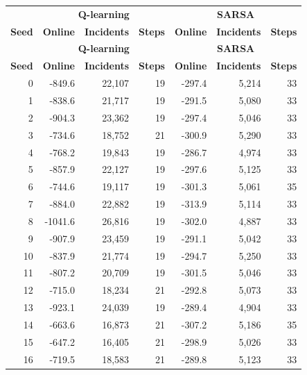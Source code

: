 \begin{longtable}{rrrrrrr}
\toprule
 & \multicolumn{3}{c}{\textbf{Q-learning}} & \multicolumn{3}{c}{\textbf{SARSA}} \\
\textbf{Seed} & \textbf{Online} & \textbf{Incidents} & \textbf{Steps}
              & \textbf{Online} & \textbf{Incidents} & \textbf{Steps} \\
\midrule
\endfirsthead
\toprule
 & \multicolumn{3}{c}{\textbf{Q-learning}} & \multicolumn{3}{c}{\textbf{SARSA}} \\
\textbf{Seed} & \textbf{Online} & \textbf{Incidents} & \textbf{Steps}
              & \textbf{Online} & \textbf{Incidents} & \textbf{Steps} \\
\midrule
\endhead
 0 &    -849.6 &  22{,}107 &    19 &    -297.4 &   5{,}214 &    33 \\
 1 &    -838.6 &  21{,}717 &    19 &    -291.5 &   5{,}080 &    33 \\
 2 &    -904.3 &  23{,}362 &    19 &    -297.4 &   5{,}046 &    33 \\
 3 &    -734.6 &  18{,}752 &    21 &    -300.9 &   5{,}290 &    33 \\
 4 &    -768.2 &  19{,}843 &    19 &    -286.7 &   4{,}974 &    33 \\
 5 &    -857.9 &  22{,}127 &    19 &    -297.6 &   5{,}125 &    33 \\
 6 &    -744.6 &  19{,}117 &    19 &    -301.3 &   5{,}061 &    35 \\
 7 &    -884.0 &  22{,}882 &    19 &    -313.9 &   5{,}114 &    33 \\
 8 &   -1041.6 &  26{,}816 &    19 &    -302.0 &   4{,}887 &    33 \\
 9 &    -907.9 &  23{,}459 &    19 &    -291.1 &   5{,}042 &    33 \\
10 &    -837.9 &  21{,}774 &    19 &    -294.7 &   5{,}250 &    33 \\
11 &    -807.2 &  20{,}709 &    19 &    -301.5 &   5{,}046 &    33 \\
12 &    -715.0 &  18{,}234 &    21 &    -292.8 &   5{,}073 &    33 \\
13 &    -923.1 &  24{,}039 &    19 &    -289.4 &   4{,}904 &    33 \\
14 &    -663.6 &  16{,}873 &    21 &    -307.2 &   5{,}186 &    35 \\
15 &    -647.2 &  16{,}405 &    21 &    -298.9 &   5{,}026 &    33 \\
16 &    -719.5 &  18{,}583 &    21 &    -289.8 &   5{,}123 &    33 \\

\end{longtable}
